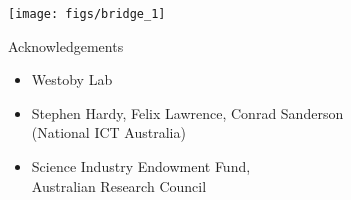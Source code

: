 \documentclass[12pt]{beamer}
\begin{document}
\begin{frame}
  \texttt{[image: figs/bridge\_1]}
\end{frame}

\begin{frame}{Acknowledgements}
  \begin{itemize}
  \item Westoby Lab
  \item Stephen Hardy, Felix Lawrence, Conrad Sanderson\\
    (National ICT Australia)
  \item Science Industry Endowment Fund,\\Australian Research Council
  \end{itemize}
\end{frame}
\end{document}
